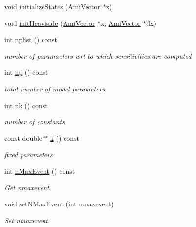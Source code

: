 \begin{DoxyCompactItemize}
\item 
void \mbox{\hyperlink{classamici_1_1_model_a73d147a7108479e20833ba816cac0f6b}{initialize\+States}} (\mbox{\hyperlink{classamici_1_1_ami_vector}{Ami\+Vector}} $\ast$x)
\item 
void \mbox{\hyperlink{classamici_1_1_model_afc1c1ffc33f397ed131f85c8321dd677}{init\+Heaviside}} (\mbox{\hyperlink{classamici_1_1_ami_vector}{Ami\+Vector}} $\ast$x, \mbox{\hyperlink{classamici_1_1_ami_vector}{Ami\+Vector}} $\ast$dx)
\item 
int \mbox{\hyperlink{classamici_1_1_model_a0f8e994055e37954d7746f3c1af27a5c}{nplist}} () const
\begin{DoxyCompactList}\small\item\em number of paramaeters wrt to which sensitivities are computed \end{DoxyCompactList}\item 
int \mbox{\hyperlink{classamici_1_1_model_ae296546c9fd4d7c4ad3b7000aa9e22ef}{np}} () const
\begin{DoxyCompactList}\small\item\em total number of model parameters \end{DoxyCompactList}\item 
int \mbox{\hyperlink{classamici_1_1_model_a3d4130da64883565a06a86e7d6029da1}{nk}} () const
\begin{DoxyCompactList}\small\item\em number of constants \end{DoxyCompactList}\item 
const double $\ast$ \mbox{\hyperlink{classamici_1_1_model_adde50e0d8a99d20354c8403bf93fab6f}{k}} () const
\begin{DoxyCompactList}\small\item\em fixed parameters \end{DoxyCompactList}\item 
int \mbox{\hyperlink{classamici_1_1_model_ac6ea00eafac9ec7be198bca04b19f4c3}{n\+Max\+Event}} () const
\begin{DoxyCompactList}\small\item\em Get nmaxevent. \end{DoxyCompactList}\item 
void \mbox{\hyperlink{classamici_1_1_model_a35f06fdd341805405b851788ffe981c4}{set\+N\+Max\+Event}} (int \mbox{\hyperlink{classamici_1_1_model_aff0f3f25d886279a90dbf0571956885c}{nmaxevent}})
\begin{DoxyCompactList}\small\item\em Set nmaxevent. \end{DoxyCompactList}\item 

\end{DoxyCompactItemize}
